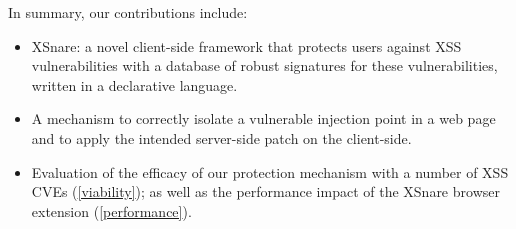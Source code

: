 In summary, our contributions include: 
\begin{itemize}

	\item XSnare: a novel client-side framework that protects
          users against XSS vulnerabilities with a database of robust
          signatures for these vulnerabilities, written in a
          declarative language.

	\item A mechanism to correctly isolate a vulnerable injection
          point in a web page and to apply the intended server-side
          patch on the client-side.

	\item Evaluation of the efficacy of our protection mechanism
          with a number of XSS CVEs (\autoref{viability}); as well as
          the performance impact of the XSnare browser extension
          (\autoref{performance}). %

\end{itemize}
